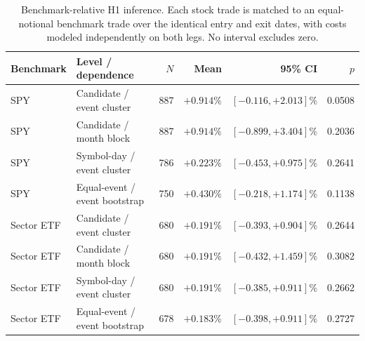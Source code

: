 \begin{table}[t]
\caption{Benchmark-relative H1 inference. Each stock trade is matched to an equal-notional benchmark trade over the identical entry and exit dates, with costs modeled independently on both legs. No interval excludes zero.}
\label{tab:benchmark}
\centering
\small
\setlength{\tabcolsep}{3.5pt}
\begin{tabular}{llrrrr}
\toprule
Benchmark & Level / dependence & $N$ & Mean & 95\% CI & $p$ \\
\midrule
SPY & Candidate / event cluster & 887 & $+0.914\%$ & $[-0.116,+2.013]\%$ & 0.0508 \\
SPY & Candidate / month block & 887 & $+0.914\%$ & $[-0.899,+3.404]\%$ & 0.2036 \\
SPY & Symbol-day / event cluster & 786 & $+0.223\%$ & $[-0.453,+0.975]\%$ & 0.2641 \\
SPY & Equal-event / event bootstrap & 750 & $+0.430\%$ & $[-0.218,+1.174]\%$ & 0.1138 \\
Sector ETF & Candidate / event cluster & 680 & $+0.191\%$ & $[-0.393,+0.904]\%$ & 0.2644 \\
Sector ETF & Candidate / month block & 680 & $+0.191\%$ & $[-0.432,+1.459]\%$ & 0.3082 \\
Sector ETF & Symbol-day / event cluster & 680 & $+0.191\%$ & $[-0.385,+0.911]\%$ & 0.2662 \\
Sector ETF & Equal-event / event bootstrap & 678 & $+0.183\%$ & $[-0.398,+0.911]\%$ & 0.2727 \\
\bottomrule
\end{tabular}
\end{table}
